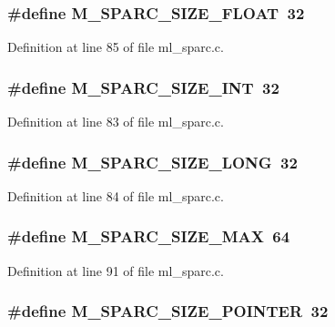 \subsubsection{\setlength{\rightskip}{0pt plus 5cm}\#define M\_\-SPARC\_\-SIZE\_\-FLOAT~32}\label{ml__sparc_8c_5d48e91334b36f93a981ae6b6596b680}




Definition at line 85 of file ml\_\-sparc.c.
\subsubsection{\setlength{\rightskip}{0pt plus 5cm}\#define M\_\-SPARC\_\-SIZE\_\-INT~32}\label{ml__sparc_8c_204a833fe7583735c82861a4b08cc894}




Definition at line 83 of file ml\_\-sparc.c.
\subsubsection{\setlength{\rightskip}{0pt plus 5cm}\#define M\_\-SPARC\_\-SIZE\_\-LONG~32}\label{ml__sparc_8c_768a9923f485a31fa70c6d3cb1a48e42}




Definition at line 84 of file ml\_\-sparc.c.
\subsubsection{\setlength{\rightskip}{0pt plus 5cm}\#define M\_\-SPARC\_\-SIZE\_\-MAX~64}\label{ml__sparc_8c_1ebabb382ada29ae117b17d3ef2476f0}




Definition at line 91 of file ml\_\-sparc.c.
\subsubsection{\setlength{\rightskip}{0pt plus 5cm}\#define M\_\-SPARC\_\-SIZE\_\-POINTER~32}\label{ml__sparc_8c_68e861c06006b8397c6b9ed4f3db6b20}




